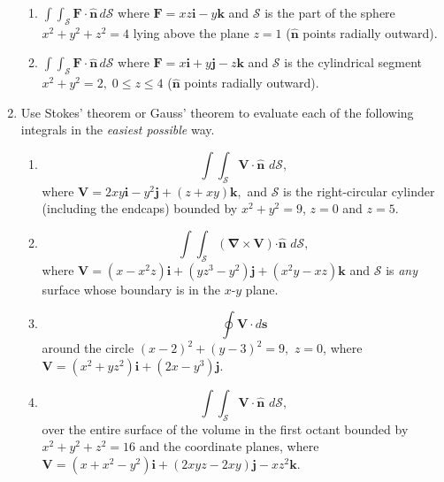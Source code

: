 \documentclass[fleqn]{article}
\begin{document}
\begin{enumerate}
\begin{enumerate}
        \item $\int \! \int_{\mathcal{S}}\mathbf{F\cdot \hat{n}}\,d\mathcal{S}$ where $\mathbf{F}=xz\mathbf{i}-y\mathbf{k}$ and
        $\mathcal{S}$ is the part of the sphere $x^{2}+y^{2}+z^{2}=4$ lying
        above the plane $z=1$ ($\mathbf{\hat{n}}$ points radially outward).
        
        \item $\int \! \int_{\mathcal{S}}\mathbf{F\cdot \hat{n}\,}d\mathcal{S}$ where $\mathbf{F}=x\mathbf{i}+y\mathbf{j}-z\mathbf{k}$ and $\mathcal{S}$ is the cylindrical segment $x^{2}+y^{2}=2,\;0\leq z\leq 4$ ($\mathbf{\hat{n}}$ points radially outward).
      \end{enumerate}
    
    
    \item Use Stokes' theorem or Gauss' theorem to evaluate each of the following integrals in the \emph{easiest possible} way. 
      \begin{enumerate}
        \item
        \[
        \int \! \int_{\mathcal{S}}\mathbf{V\cdot \hat{n}}\,\,d\mathcal{S},
        \]
        where $\mathbf{V}=2xy\mathbf{i}-y^{2}\mathbf{j}+\left(
        z+xy\right) \mathbf{k},$ and $\mathcal{S}$ is the right-circular
        cylinder (including the endcaps) bounded by $x^{2}+y^{2}=9$, $z=0$ and
        $z=5$.
        
        \item
        \[
        \int \! \int_{\mathcal{S}}\left( \mathbf{\nabla \times V}\right)
        \mathbf{\cdot \hat{n}\,}\,d\mathcal{S},
        \]
        where $\mathbf{V}=\left( x-x^{2}z\right) \mathbf{i}+\left(
        yz^{3}-y^{2}\right) \mathbf{j}+\left( x^{2}y-xz\right) \mathbf{k} $ and $\mathcal{S}$ is \emph{any} surface whose boundary is in the $x$-$y$ plane.
        
        \item
        \[
        \oint \mathbf{V\cdot }d\mathbf{s}
        \]
        around the circle $\left( x-2\right) ^{2}+\left( y-3\right) ^{2}=9,$ $z=0$, where $\mathbf{V}=\left( x^{2}+yz^{2}\right) \mathbf{i}+\left(2x-y^{3}\right) \mathbf{j}$.
        
        \item
        \[
        \int \! \int_{\mathcal{S}}\mathbf{V\cdot \hat{n}}\,\,d\mathcal{S},
        \]
        over the entire surface of the volume in the first octant bounded by $
        x^{2}+y^{2}+z^{2}=16$ and the coordinate planes, where $\mathbf{V}=\left(x+x^{2}-y^{2}\right) \mathbf{i}+\left( 2xyz-2xy\right) \mathbf{j}-xz^{2}\mathbf{k}$.
        

\end{enumerate}
\end{enumerate}
\end{document}
